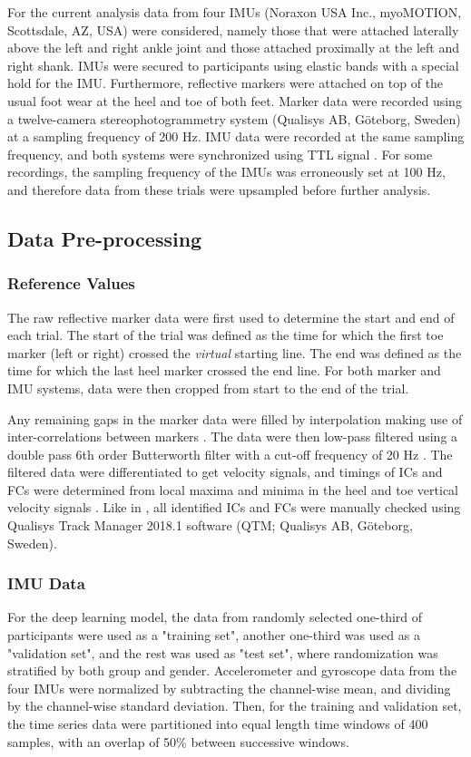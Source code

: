 \documentclass[sensors,article,submit,pdftex,moreauthors]{Definitions/mdpi}
\begin{document}
For the current analysis data from four IMUs (Noraxon USA Inc., myoMOTION, Scottsdale, AZ, USA) were considered, namely those that were attached laterally above the left and right ankle joint and those attached proximally at the left and right shank. IMUs were secured to participants using elastic bands with a special hold for the IMU. Furthermore, reflective markers were attached on top of the usual foot wear at the heel and toe of both feet. Marker data were recorded using a twelve-camera stereophotogrammetry system (Qualisys AB, G\"{o}teborg, Sweden) at a sampling frequency of 200 Hz. IMU data were recorded at the same sampling frequency, and both systems were synchronized using TTL signal \cite{Warmerdam2021}. For some recordings, the sampling frequency of the IMUs was erroneously set at 100 Hz, and therefore data from these trials were upsampled before further analysis.

\subsection{Data Pre-processing \label{subsec:data_preprocessing}}
\subsubsection{Reference Values}
The raw reflective marker data were first used to determine the start and end of each trial. The start of the trial was defined as the time for which the first toe marker (left or right) crossed the \emph{virtual} starting line. The end was defined as the time for which the last heel marker crossed the end line. For both marker and IMU systems, data were then cropped from start to the end of the trial.

Any remaining gaps in the marker data were filled by interpolation making use of inter-correlations between markers \cite{Federolf2013,Gloersen2016}. The data were then low-pass filtered using a double pass 6th order Butterworth filter with a cut-off frequency of 20 Hz \cite{Kormylo1974,Racz2021}. The filtered data were differentiated to get velocity signals, and timings of ICs and FCs were determined from local maxima and minima in the heel and toe vertical velocity signals \cite{Pijnappels2001,OConnor2007}. Like in \cite{Carcreff2018,Romijnders2021}, all identified ICs and FCs were manually checked using Qualisys Track Manager 2018.1 software (QTM; Qualisys AB, Göteborg, Sweden).

\subsubsection{IMU Data}
For the deep learning model, the data from randomly selected one-third of participants were used as a "training set", another one-third was used as a "validation set", and the rest was used as "test set", where randomization was stratified by both group and gender. Accelerometer and gyroscope data from the four IMUs were normalized by subtracting the channel-wise mean, and dividing by the channel-wise standard deviation. Then, for the training and validation set, the time series data were partitioned into equal length time windows of 400 samples, with an overlap of 50\% between successive windows.
\end{document}
